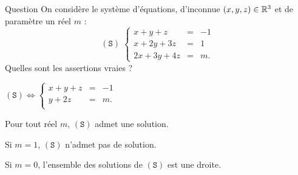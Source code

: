 \begin{multi}[multiple,feedback=
{\[(\mathtt{S}) \Leftrightarrow  
\left\{\begin{array}{rcc}
x+y+z&=&-1\\
y+2z&=&2\\ 
y+2z&=&m+2\\ 
\end{array}\right. \Leftrightarrow  
\left\{\begin{array}{rcc}
x+y+z&=&-1\\
y+2z&=&2\\ 
0&=&m.\\ 
\end{array}\right.\]
On en déduit que si \(m\neq 0\), \((\mathtt{S})\) n'admet pas de solution et que si \(m=0\), l'ensemble des solutions de 
\((\mathtt{S})\) est la droite :
\(\{(-3+z,2-2z,z); \; z\in \Rr\}\).
}]{Question}
On considère le système d'équations, d'inconnue \((x,y,z)\in \mathbb{R}^3\) et de paramètre un réel \(m\) :
\[(\mathtt{S}) \; \left\{\begin{array}{rcc}
x+y+z&=&-1\\
x+2y+3z&=&1\\
2x+3y+4z&=&m.\end{array}\right.\]
Quelles sont les assertions vraies ?

    \item \((\mathtt{S}) \Leftrightarrow
\left\{\begin{array}{rcc}
x+y+z&=&-1\\
y+2z&=&m.\\
\end{array}\right.\)
    \item Pour tout réel \(m\), \((\mathtt{S})\) admet une solution.
    \item* Si \(m=1\), \((\mathtt{S})\) n'admet pas de solution.
    \item* Si \(m=0\), l'ensemble des solutions de \((\mathtt{S})\) est une droite.
\end{multi}


